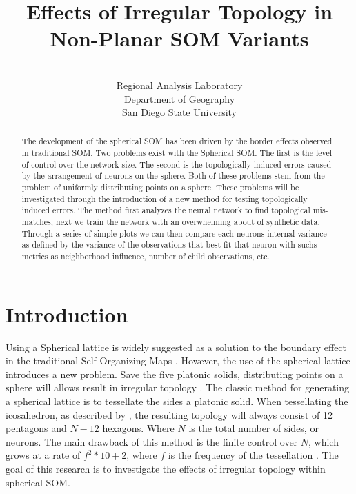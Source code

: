 \documentclass[12pt]{article}
\title{Effects of Irregular Topology in Non-Planar SOM Variants}
\author{\sc{Charles R. Schmidt}\\Regional Analysis Laboratory\\Department of Geography\\San Diego State University}
\begin{document}
\maketitle
\begin{abstract}
The development of the spherical SOM has been driven by the border effects
observed in traditional SOM.  Two problems exist with the Spherical SOM. The
first is the level of control over the network size. The second is the
topologically induced errors caused by the arrangement of neurons on the sphere.
Both of these problems stem from the problem of uniformly distributing points on
a sphere. These problems will be investigated through the introduction of a new method for
testing topologically induced errors. The method first analyzes  the neural
network to find topological mis-matches, next we train the network with an
overwhelming about of synthetic data.  Through a series of simple plots we can
then compare each neurons internal variance as defined by the variance of the
observations that best fit that neuron with suchs metrics as neighborhood
influence, number of child observations, etc.
\end{abstract}



\section{Introduction}
Using a Spherical lattice is widely suggested as a solution to the boundary
effect in the traditional Self-Organizing Maps \citep{ritter99, boudjemai2003,
sangole03, Wu:2006lr, Nishio:2006fk}.  However, the use of the spherical lattice
introduces a new problem.  Save the five platonic solids, distributing points on
a sphere will allows result in irregular topology \citep{ritter99}.  The classic
method for generating a spherical lattice is to tessellate the sides a platonic
solid.  When tessellating the icosahedron, as described by \cite{Wu:2006lr}, the
resulting topology will always consist of 12 pentagons and \(N-12\) hexagons.
Where \(N\) is the total number of sides, or neurons.  The main drawback of this
method is the finite control over \(N\), which grows at a rate of \(f^2*10+2\),
where \(f\) is the frequency of the tessellation \citep{Wu:2006lr}.  The goal of
this research is to investigate the effects of irregular topology within
spherical SOM.
\end{document}
